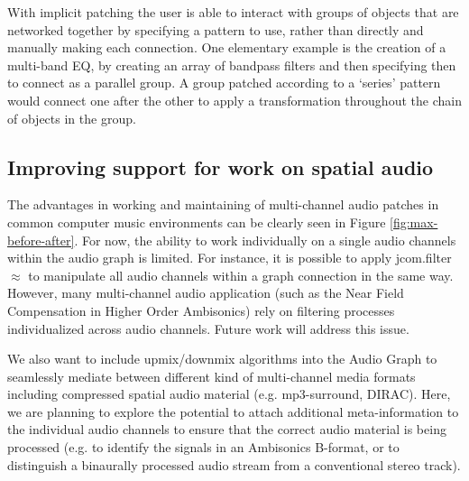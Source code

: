 \documentclass[twoside,a4paper]{article}
\begin{document}
With implicit patching the user is able to interact with groups of objects that are networked together by specifying a pattern to use, rather than directly and manually making each connection.  
One elementary example is the creation of a multi-band EQ, by creating an array of bandpass filters and then specifying then to connect as a parallel group.  
A group patched according to a `series' pattern would connect one after the other to apply a transformation throughout the chain of objects in the group.





\subsection{Improving support for work on spatial audio} %

The advantages in working and maintaining of multi-channel audio patches in common computer music environments can be clearly seen in Figure \ref{fig:max-before-after}. 
For now, the ability to work individually on a single audio channels within the audio graph is limited.
For instance, it is possible to apply jcom.filter$\approx$ to manipulate all audio channels within a graph connection in the same way. However, many multi-channel audio application (such as the Near Field Compensation in Higher Order Ambisonics) rely on filtering processes individualized across audio channels. Future work will address this issue.

We also want to include upmix/downmix algorithms into the Audio Graph to seamlessly mediate between different kind of multi-channel media formats including compressed spatial audio material (e.g. mp3-surround, DIRAC). Here, we are planning to explore the potential to attach additional meta-information to the individual audio channels to ensure that the correct audio material is being processed (e.g. to identify the signals in an Ambisonics B-format, or to distinguish a binaurally processed audio stream from a conventional stereo track). 
\end{document}
